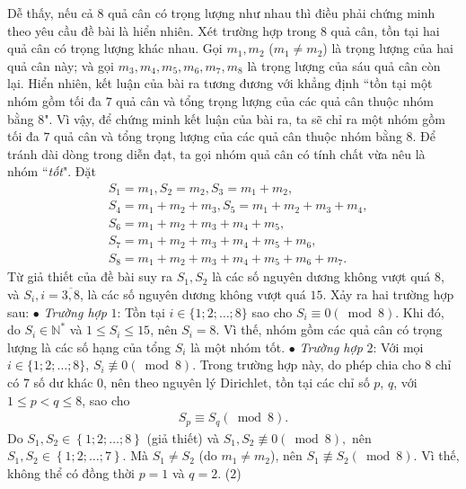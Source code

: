 \begin{multicols}{2}
	\vskip 0.05cm
	Dễ thấy, nếu cả $8$ quả cân có trọng lượng như nhau thì điều phải chứng minh theo yêu cầu đề bài là hiển nhiên.
	\vskip 0.05cm
	Xét trường hợp trong $8$ quả cân, tồn tại hai quả cân có trọng lượng khác nhau. Gọi $m_1, m_2$  ($m_1 \ne m_2$) là trọng lượng của hai quả cân này; và gọi $m_3, m_4, m_5,m_6,m_7,m_8$  là trọng lượng của sáu quả cân còn lại.
	\vskip 0.05cm
	Hiển nhiên, kết luận của bài ra tương đương với khẳng định ``tồn tại một nhóm gồm tối đa $7$ quả cân và tổng trọng lượng của các quả cân thuộc nhóm bằng $8$".
	\vskip 0.05cm
	Vì vậy, để chứng minh kết luận của bài ra, ta sẽ chỉ ra một nhóm gồm tối đa $7$ quả cân và tổng trọng lượng của các quả cân thuộc nhóm bằng $8$. Để tránh dài dòng trong diễn đạt, ta gọi nhóm quả cân có tính chất vừa nêu là nhóm ``\textit{tốt}".
	\vskip 0.05cm
	Đặt
	\begin{align*}
		&{S_1} = {m_1},{S_2} = {m_2},{S_3} = {m_1} + {m_2},\\
		&{S_4} = {m_1} \!+\! {m_2} \!+\! {m_3},
		{S_5} = {m_1} \!+\! {m_2} \!+\! {m_3} \!+\! {m_4},\\
		&{S_6} = {m_1} + {m_2} + {m_3} + {m_4} + {m_5},\\
		&{S_7} = {m_1} + {m_2} + {m_3} + {m_4} + {m_5} + {m_6},\\
		&{S_8} = {m_1} + {m_2} + {m_3} + {m_4} + {m_5} + {m_6} + {m_7}.
	\end{align*}
	Từ giả thiết của đề bài suy ra $S_1,S_2$  là các số nguyên dương không vượt quá $8$, và $S_i, i = \overline{3,8}$,  là các số nguyên dương không vượt quá $15$.
	\vskip 0.05cm
	Xảy ra hai trường hợp sau:
	\vskip 0.05cm
	$\bullet$ \textit{Trường hợp} $1$: Tồn tại $i \in \{1; 2; \ldots; 8\}$ sao cho ${S_i} \equiv 0\left( {\bmod 8} \right).$
	\vskip 0.05cm 
	Khi đó, do $S_i \in \mathbb{N^*}$  và $1 \le S_i \le 15$,  nên $S_i = 8$.  Vì thế, nhóm gồm các quả cân có trọng lượng là các số hạng của tổng $S_i$  là một nhóm tốt.
	\vskip 0.05cm
	$\bullet$ \textit{Trường hợp} $2$: Với mọi $i \in \{1; 2; \ldots; 8\}$,  ${S_i}\not  \equiv 0\left( {\bmod 8} \right).$
	\vskip 0.05cm
	Trong trường hợp này, do phép chia cho $8$ chỉ có $7$ số dư khác 0, nên theo nguyên lý Dirichlet, tồn tại các chỉ số $p$, $q$, với $1 \le p < q \le 8$, sao cho
	\begin{align*}
		{S_p} \equiv {S_q}\left( {\bmod 8} \right). \tag{$1$}
	\end{align*}
	Do ${S_1},{S_2} \in \left\{ {1;2; \ldots ;8} \right\}$ (giả thiết) và  ${S_1},{S_2}\not  \equiv 0\left( {\bmod 8} \right),$ nên ${S_1},{S_2} \in \left\{ {1;2; \ldots ;7} \right\}.$  Mà $S_1 \ne S_2$  (do  $m_1 \ne m_2$), nên ${S_1}\not  \equiv {S_2}\left( {\bmod 8} \right).$  Vì thế, không thể có đồng thời $p = 1$ và $q = 2$. \hfill    ($2$)

\end{multicols}
